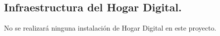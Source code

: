 \subsection{Infraestructura del Hogar Digital.}

No se realizará ninguna instalación de Hogar Digital en este proyecto.